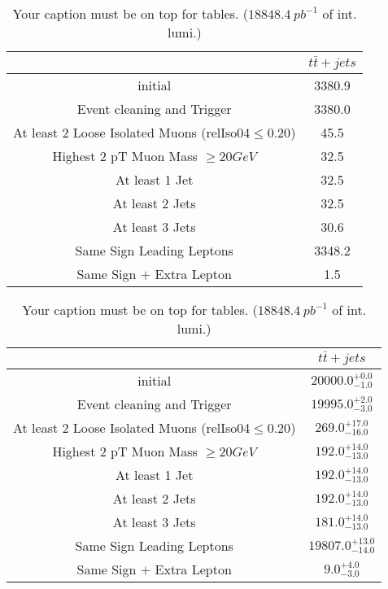 \documentclass{article}
\begin{document}
\begin{table}
\caption{Your caption must be on top for tables. ($18848.4~pb^{-1}$ of int. lumi.)}
\label{tab:}
\centering
\begin{tabular}{|c|c|}
\toprule
&$t\bar{t}+jets$	\\

\midrule
initial&	3380.9	\\

Event cleaning and Trigger&	3380.0	\\

At least 2 Loose Isolated Muons (relIso04$\leq 0.20$)&	45.5	\\

Highest 2 pT Muon Mass $\geq 20 GeV$&	32.5	\\

At least 1  Jet&	32.5	\\

At least 2 Jets&	32.5	\\

At least 3 Jets&	30.6	\\

Same Sign Leading Leptons&	3348.2	\\

Same Sign $+$ Extra Lepton&	1.5	\\

\bottomrule
\end{tabular}
\end{table}
\begin{table}
\caption{Your caption must be on top for tables. ($18848.4~pb^{-1}$ of int. lumi.)}
\label{tab:}
\centering
\begin{tabular}{|c|c|}
\toprule
&$t\bar{t}+jets$	\\

\midrule
initial&	$20000.0^{+0.0}_{-1.0}$	\\

Event cleaning and Trigger&	$19995.0^{+2.0}_{-3.0}$	\\

At least 2 Loose Isolated Muons (relIso04$\leq 0.20$)&	$269.0^{+17.0}_{-16.0}$	\\

Highest 2 pT Muon Mass $\geq 20 GeV$&	$192.0^{+14.0}_{-13.0}$	\\

At least 1  Jet&	$192.0^{+14.0}_{-13.0}$	\\

At least 2 Jets&	$192.0^{+14.0}_{-13.0}$	\\

At least 3 Jets&	$181.0^{+14.0}_{-13.0}$	\\

Same Sign Leading Leptons&	$19807.0^{+13.0}_{-14.0}$	\\

Same Sign $+$ Extra Lepton&	$9.0^{+4.0}_{-3.0}$	\\

\bottomrule
\end{tabular}
\end{table}
\end{document}
